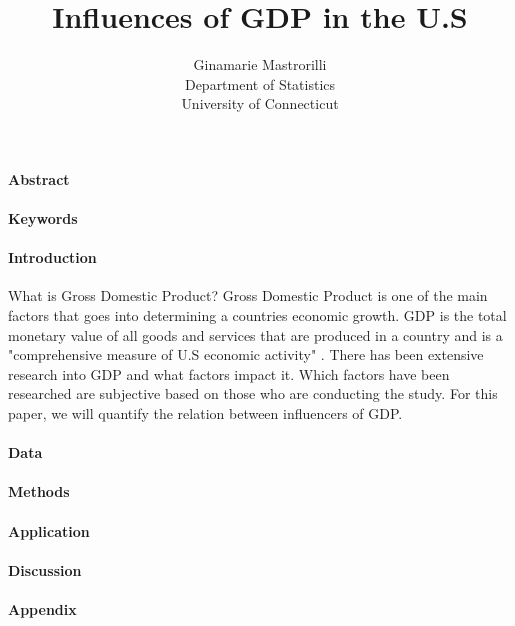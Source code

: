 \documentclass[12pt]{article}
\title{Influences of GDP in the U.S }
\author{Ginamarie Mastrorilli\\
  Department of Statistics\\
  University of Connecticut
}
\begin{document}
\maketitle


\paragraph{Abstract}


\paragraph{Keywords}



\paragraph{Introduction}


What is Gross Domestic Product? Gross Domestic Product is one of the main factors that goes into determining a countries economic growth. 
GDP is the total monetary value of all goods and services that are produced in a country and is a "comprehensive measure of U.S economic activity" \citet[]{bea}.
There has been extensive research into GDP and what factors impact it. 
Which factors have been researched are subjective based on those who are conducting the study.
For this paper, we will quantify the relation between influencers of GDP. 







\paragraph{Data}



\paragraph{Methods}




\paragraph{Application}




\paragraph{Discussion}


\paragraph{Appendix}




\end{document}
